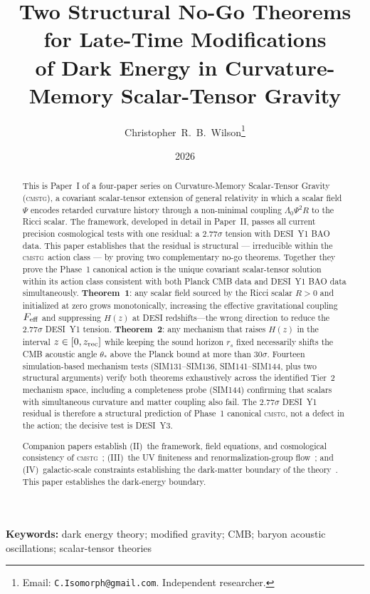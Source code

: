 \documentclass[12pt,a4paper]{article}
\title{\textbf{Two Structural No-Go Theorems for Late-Time Modifications\\
       of Dark Energy in Curvature-Memory Scalar-Tensor Gravity}}
\author{Christopher~R.~B.~Wilson\thanks{Email: \texttt{C.Isomorph@gmail.com}. Independent researcher.}}
\date{2026}
\newcommand{\CMSTG}{\textsc{cmstg}}
\newcommand{\Feff}{F_{\rm eff}}
\newcommand{\Lz}{\Lambda_0}
\newcommand{\thetastar}{\theta_*}
\newcommand{\rs}{r_s}
\theoremstyle{plain}
\begin{document}
\maketitle

\begin{abstract}
This is Paper~I of a four-paper series on Curvature-Memory Scalar-Tensor
Gravity (\CMSTG), a covariant scalar-tensor extension of general relativity
in which a scalar field $\Psi$ encodes retarded curvature history through a
non-minimal coupling $\Lz\Psi^2 R$ to the Ricci scalar. The framework,
developed in detail in Paper~II, passes all current precision cosmological
tests with one residual: a $2.77\sigma$ tension with DESI~Y1 BAO data.
This paper establishes that the residual is structural --- irreducible within
the \CMSTG\ action class --- by proving two complementary no-go theorems.
Together they prove the Phase~1 canonical action is the unique covariant
scalar-tensor solution within its action class consistent with both Planck
CMB data and DESI~Y1 BAO data simultaneously.
\textbf{Theorem~1}: any scalar field sourced by the Ricci scalar $R>0$
and initialized at zero grows monotonically, increasing the effective
gravitational coupling $\Feff$ and suppressing $H(z)$ at DESI
redshifts---the wrong direction to reduce the $2.77\sigma$ DESI~Y1
tension. \textbf{Theorem~2}: any mechanism that raises $H(z)$ in the
interval $z\in[0,z_{\rm rec}]$ while keeping the sound horizon $\rs$
fixed necessarily shifts the CMB acoustic angle $\thetastar$ above the
Planck bound at more than $30\sigma$. Fourteen simulation-based mechanism
tests (SIM131--SIM136, SIM141--SIM144, plus two structural arguments)
verify both theorems exhaustively across the identified Tier~2 mechanism
space, including a completeness probe (SIM144) confirming that scalars
with simultaneous curvature and matter coupling also fail.
The $2.77\sigma$ DESI~Y1 residual is therefore a structural
prediction of Phase~1 canonical \CMSTG, not a defect in the action; the
decisive test is DESI~Y3.

Companion papers establish (II)~the framework, field equations, and
cosmological consistency of \CMSTG~\cite{WilsonPaperII}; (III)~the UV
finiteness and renormalization-group flow~\cite{WilsonPaperIII}; and
(IV)~galactic-scale constraints establishing the dark-matter boundary of
the theory~\cite{WilsonPaperIV}. This paper establishes the dark-energy
boundary.
\end{abstract}

\noindent\textbf{Keywords:} dark energy theory; modified gravity; CMB; baryon acoustic oscillations; scalar-tensor theories
\end{document}
